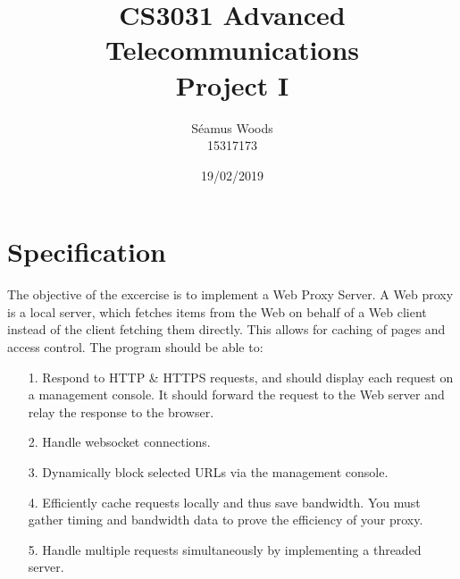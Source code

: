 \documentclass[12pt]{report}
\title{CS3031 Advanced Telecommunications \\ Project I}
\author{Séamus Woods \\ 15317173}
\date{19/02/2019}
\begin{document}
\maketitle
\newpage


\section{Specification}
The objective of the excercise is to implement a Web Proxy Server. A Web proxy is a local server, which fetches items from the Web on behalf of a Web client instead of the client fetching them directly. This allows for caching of pages and access control.
\newline
\newline
The program should be able to:
\begin{itemize}
\item[1.] Respond to HTTP \& HTTPS requests, and should display each request on a management console. It should forward the request to the Web server and relay the response to the browser.
\item[2.] Handle websocket connections.
\item[3.] Dynamically block selected URLs via the management console.
\item[4.] Efficiently cache requests locally and thus save bandwidth. You must gather timing and bandwidth data to prove the efficiency of your proxy.
\item[5.] Handle multiple requests simultaneously by implementing a threaded server. 
\end{itemize}
\end{document}
